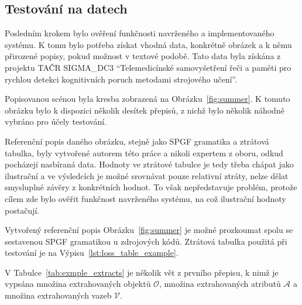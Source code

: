 \subsection{Testování na datech}
Posledním krokem bylo ověření funkčnosti navrženého a implementovaného systému.
K tomu bylo potřeba získat vhodná data, konkrétně obrázek a k němu přirozené popisy, pokud možnost v textové podobě.
Tato data byla získána z projektu TAČR SIGMA\_DC3 \enquote{Telemedicínské samovyšetření řeči
	a paměti pro rychlou detekci kognitivních poruch metodami strojového učení}.

Popisovanou scénou byla kresba zobrazená na Obrázku~\ref{fig:summer}.
K tomuto obrázku bylo k dispozici několik desítek přepisů, z nichž bylo několik náhodně vybráno pro účely testování.

Referenční popis daného obrázku, stejně jako SPGF gramatika a ztrátová tabulka,
byly vytvořené autorem této práce a nikoli expertem z oboru, odkud pocházejí nasbíraná data.
Hodnoty ve ztrátové tabulce je tedy třeba chápat jako ilustrační a ve výsledcích je možné srovnávat pouze relativní ztráty,
nelze dělat smysluplné závěry z konkrétních hodnot.
To však nepředstavuje problém, protože cílem zde bylo ověřit funkčnost navrženého systému, na což ilustrační hodnoty postačují.

Vytvořený referenční popis Obrázku~\ref{fig:summer} je možné prozkoumat spolu se sestavenou SPGF gramatikou u zdrojových kódů.
Ztrátová tabulka použitá při testování je na Výpisu~\ref{lst:loss_table_example}.



V Tabulce~\ref{tab:exmple_extracts} je několik vět z prvního přepisu, k nimž je vypsána množina extrahovaných objektů $\mathcal{O}$,
množina extrahovaných atributů $\mathcal A$ a množina extrahovaných vazeb $\mathcal V$.

